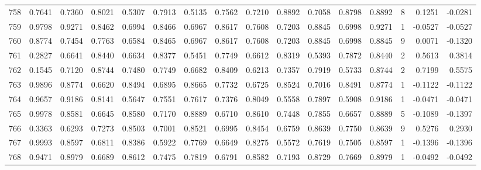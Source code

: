 \begin{tabular}{lrrrrrrrrrrrrrrr}
758 &      0.7641 &  0.7360 &  0.8021 &  0.5307 &  0.7913 &  0.5135 &  0.7562 &  0.7210 &  0.8892 &  0.7058 &   0.8798 &     0.8892 &      8 &                    0.1251 &                    -0.0281 \\
759 &      0.9798 &  0.9271 &  0.8462 &  0.6994 &  0.8466 &  0.6967 &  0.8617 &  0.7608 &  0.7203 &  0.8845 &   0.6998 &     0.9271 &      1 &                   -0.0527 &                    -0.0527 \\
760 &      0.8774 &  0.7454 &  0.7763 &  0.6584 &  0.8465 &  0.6967 &  0.8617 &  0.7608 &  0.7203 &  0.8845 &   0.6998 &     0.8845 &      9 &                    0.0071 &                    -0.1320 \\
761 &      0.2827 &  0.6641 &  0.8440 &  0.6634 &  0.8377 &  0.5451 &  0.7749 &  0.6612 &  0.8319 &  0.5393 &   0.7872 &     0.8440 &      2 &                    0.5613 &                     0.3814 \\
762 &      0.1545 &  0.7120 &  0.8744 &  0.7480 &  0.7749 &  0.6682 &  0.8409 &  0.6213 &  0.7357 &  0.7919 &   0.5733 &     0.8744 &      2 &                    0.7199 &                     0.5575 \\
763 &      0.9896 &  0.8774 &  0.6620 &  0.8494 &  0.6895 &  0.8665 &  0.7732 &  0.6725 &  0.8524 &  0.7016 &   0.8491 &     0.8774 &      1 &                   -0.1122 &                    -0.1122 \\
764 &      0.9657 &  0.9186 &  0.8141 &  0.5647 &  0.7551 &  0.7617 &  0.7376 &  0.8049 &  0.5558 &  0.7897 &   0.5908 &     0.9186 &      1 &                   -0.0471 &                    -0.0471 \\
765 &      0.9978 &  0.8581 &  0.6645 &  0.8580 &  0.7170 &  0.8889 &  0.6710 &  0.8610 &  0.7448 &  0.7855 &   0.6657 &     0.8889 &      5 &                   -0.1089 &                    -0.1397 \\
766 &      0.3363 &  0.6293 &  0.7273 &  0.8503 &  0.7001 &  0.8521 &  0.6995 &  0.8454 &  0.6759 &  0.8639 &   0.7750 &     0.8639 &      9 &                    0.5276 &                     0.2930 \\
767 &      0.9993 &  0.8597 &  0.6811 &  0.8386 &  0.5922 &  0.7769 &  0.6649 &  0.8275 &  0.5572 &  0.7619 &   0.7505 &     0.8597 &      1 &                   -0.1396 &                    -0.1396 \\
768 &      0.9471 &  0.8979 &  0.6689 &  0.8612 &  0.7475 &  0.7819 &  0.6791 &  0.8582 &  0.7193 &  0.8729 &   0.7669 &     0.8979 &      1 &                   -0.0492 &                    -0.0492 \\

\end{tabular}
